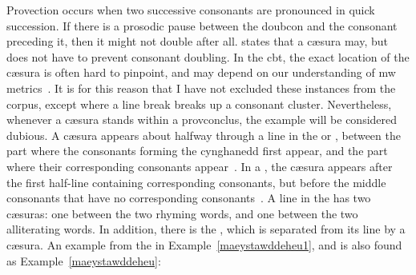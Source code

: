 Provection occurs when two successive consonants are pronounced in quick succession. If there is a prosodic pause between the \gls{doubcon} and the consonant preceding it, then it might not double after all. \Textcite[§~392]{morris-jones_cerdd_1925} states that a cæsura may, but does not have to prevent consonant doubling. In the \gls{cbt}, the exact location of the cæsura is often hard to pinpoint, and may depend on our understanding of \gls{mw} metrics~\autocite[241]{daniel_cyfuniadau_2003}. It is for this reason that I have not excluded these instances from the corpus, except where a line break breaks up a consonant cluster. Nevertheless, whenever a cæsura stands within a \gls{provconclus}, the example will be considered dubious. A cæsura appears about halfway through a line in the  or , \ie between the part where the consonants forming the cynghanedd first appear, and the part where their corresponding consonants appear~\autocite[§~233]{morris-jones_cerdd_1925}. In a , the cæsura  appears after the first half-line containing corresponding consonants, but before the middle consonants that have no corresponding consonants~\autocite[§~255]{morris-jones_cerdd_1925}. A line in the  has two cæsuras: one between the two rhyming words, and one between the two alliterating words. In addition, there is the , which is separated from its line by a cæsura.
%   
%   
%   
%   
An example from the  in Example~\ref{maeystawddeheu1}, and is also found as Example~\ref{maeystawddeheu}: %
